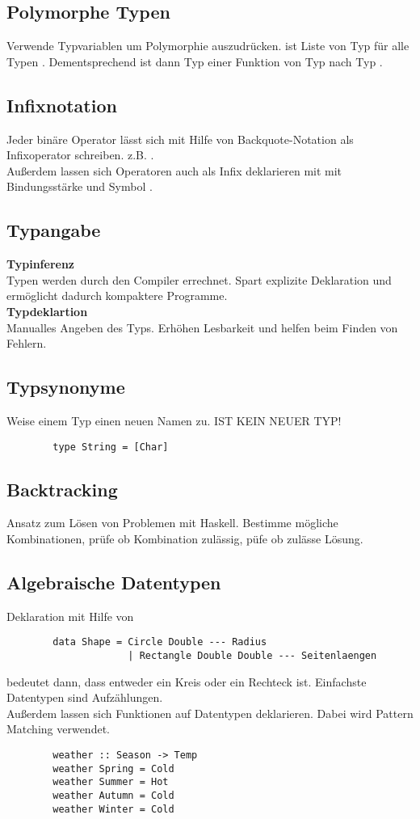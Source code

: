 \subsection{Polymorphe Typen}
Verwende Typvariablen um Polymorphie auszudrücken.
\code{[t]} ist Liste von Typ  für alle Typen .
Dementsprechend ist dann  Typ einer Funktion von Typ  nach Typ .
        
\subsection{Infixnotation}
Jeder binäre Operator lässt sich mit Hilfe von Backquote-Notation als Infixoperator schreiben.
z.B. .\\
Außerdem lassen sich Operatoren auch als Infix deklarieren mit  mit Bindungsstärke  und Symbol .

\subsection{Typangabe}
\textbf{Typinferenz}\\
Typen werden durch den Compiler errechnet. Spart explizite Deklaration und ermöglicht dadurch kompaktere Programme.\\
\textbf{Typdeklartion}\\
Manualles Angeben des Typs. Erhöhen Lesbarkeit und helfen beim Finden von Fehlern.

\subsection{Typsynonyme}
Weise einem Typ einen neuen Namen zu. IST KEIN NEUER TYP!
\begin{lstlisting}
        type String = [Char]
\end{lstlisting}

\subsection{Backtracking}
Ansatz zum Lösen von Problemen mit Haskell.
Bestimme mögliche Kombinationen, prüfe ob Kombination zulässig, püfe ob zulässe Lösung.

\subsection{Algebraische Datentypen}
Deklaration mit Hilfe von 
\begin{lstlisting}
        data Shape = Circle Double --- Radius
                     | Rectangle Double Double --- Seitenlaengen
\end{lstlisting}
 bedeutet dann, dass  entweder ein Kreis oder ein Rechteck ist.
Einfachste Datentypen sind Aufzählungen.\\
Außerdem lassen sich Funktionen auf Datentypen deklarieren. Dabei wird Pattern Matching verwendet.
\begin{lstlisting}
        weather :: Season -> Temp
        weather Spring = Cold
        weather Summer = Hot
        weather Autumn = Cold
        weather Winter = Cold
\end{lstlisting}

